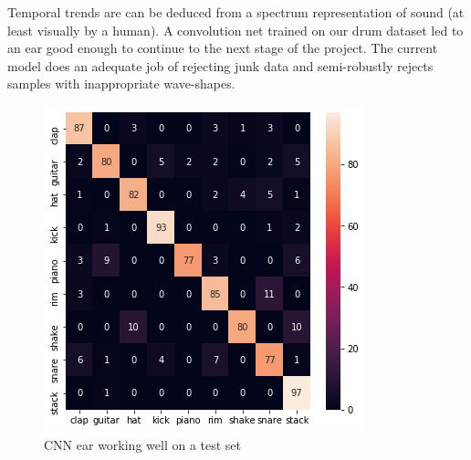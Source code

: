 \documentclass{nime-alternate} %
\begin{document}
Temporal trends are can be deduced from a spectrum representation of sound (at least visually by a human). A convolution net trained on our drum dataset led to an ear good enough to continue to the next stage of the project. The current model does an adequate job of rejecting junk data and semi-robustly rejects samples with inappropriate wave-shapes.
\begin{figure}[H]
\centering
\includegraphics[width=0.8\linewidth]{images/cnn_ear.png}
\caption{CNN ear working well on a test set}
\label{fig:ok ear}
\end{figure}
\end{document}
